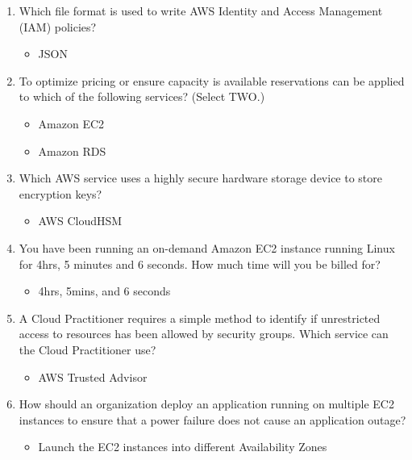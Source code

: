 \begin{enumerate}
	\item Which file format is used to write AWS Identity and Access Management (IAM) policies?

	\begin{itemize}
	\item JSON
\end{itemize}

	\item To optimize pricing or ensure capacity is available reservations can be applied to which of the following services? (Select TWO.)

	\begin{itemize}
	\item Amazon EC2
	\item Amazon RDS
\end{itemize}

	\item Which AWS service uses a highly secure hardware storage device to store encryption keys?

	\begin{itemize}
	\item AWS CloudHSM
\end{itemize}

	\item You have been running an on-demand Amazon EC2 instance running Linux for 4hrs, 5 minutes and 6 seconds. How much time will you be billed for?

	\begin{itemize}
	\item 4hrs, 5mins, and 6 seconds
\end{itemize}

	\item A Cloud Practitioner requires a simple method to identify if unrestricted access to resources has been allowed by security groups. Which service can the Cloud Practitioner use?

	\begin{itemize}
	\item AWS Trusted Advisor
\end{itemize}

	\item How should an organization deploy an application running on multiple EC2 instances to ensure that a power failure does not cause an application outage?

	\begin{itemize}
	\item Launch the EC2 instances into different Availability Zones
\end{itemize}


\end{enumerate}
